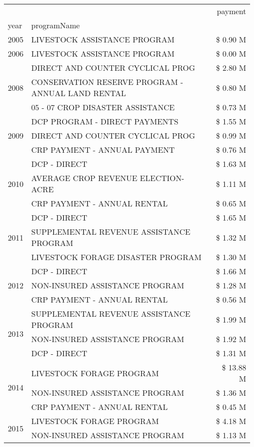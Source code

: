 \begin{tabular}{llr}
\toprule
 &  & payment \\
year & programName &  \\
\midrule
2005 & LIVESTOCK ASSISTANCE PROGRAM & \$ 0.90 M \\
\cline{1-3}
2006 & LIVESTOCK ASSISTANCE PROGRAM & \$ 0.00 M \\
\cline{1-3}
\multirow[t]{3}{*}{2008} & DIRECT AND COUNTER CYCLICAL PROG & \$ 2.80 M \\
 & CONSERVATION RESERVE PROGRAM - ANNUAL LAND RENTAL & \$ 0.80 M \\
 & 05 - 07 CROP DISASTER ASSISTANCE & \$ 0.73 M \\
\cline{1-3}
\multirow[t]{3}{*}{2009} & DCP PROGRAM - DIRECT PAYMENTS & \$ 1.55 M \\
 & DIRECT AND COUNTER CYCLICAL PROG & \$ 0.99 M \\
 & CRP PAYMENT - ANNUAL PAYMENT & \$ 0.76 M \\
\cline{1-3}
\multirow[t]{3}{*}{2010} & DCP - DIRECT & \$ 1.63 M \\
 & AVERAGE CROP REVENUE ELECTION-ACRE & \$ 1.11 M \\
 & CRP PAYMENT - ANNUAL RENTAL & \$ 0.65 M \\
\cline{1-3}
\multirow[t]{3}{*}{2011} & DCP - DIRECT & \$ 1.65 M \\
 & SUPPLEMENTAL REVENUE ASSISTANCE PROGRAM & \$ 1.32 M \\
 & LIVESTOCK FORAGE DISASTER PROGRAM & \$ 1.30 M \\
\cline{1-3}
\multirow[t]{3}{*}{2012} & DCP - DIRECT & \$ 1.66 M \\
 & NON-INSURED ASSISTANCE PROGRAM & \$ 1.28 M \\
 & CRP PAYMENT - ANNUAL RENTAL & \$ 0.56 M \\
\cline{1-3}
\multirow[t]{3}{*}{2013} & SUPPLEMENTAL REVENUE ASSISTANCE PROGRAM & \$ 1.99 M \\
 & NON-INSURED ASSISTANCE PROGRAM & \$ 1.92 M \\
 & DCP - DIRECT & \$ 1.31 M \\
\cline{1-3}
\multirow[t]{3}{*}{2014} & LIVESTOCK FORAGE PROGRAM & \$ 13.88 M \\
 & NON-INSURED ASSISTANCE PROGRAM & \$ 1.36 M \\
 & CRP PAYMENT - ANNUAL RENTAL & \$ 0.45 M \\
\cline{1-3}
\multirow[t]{3}{*}{2015} & LIVESTOCK FORAGE PROGRAM & \$ 4.18 M \\
 & NON-INSURED ASSISTANCE PROGRAM & \$ 1.13 M \\

\end{tabular}
